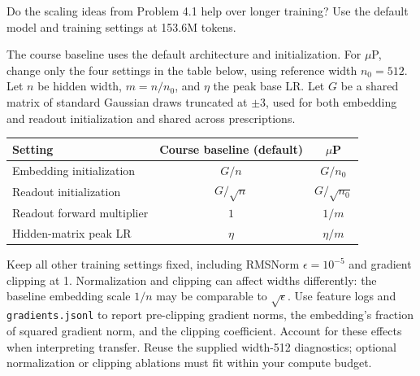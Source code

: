 \clearpage
{}

Do the scaling ideas from Problem 4.1 help over longer training? Use the
default model and training settings at 153.6M tokens.

The course baseline uses the default architecture and initialization.
For $\mu$P, change only the four settings in the table below, using reference
width $n_0=512$. Let $n$ be hidden width, $m=n/n_0$, and $\eta$ the peak base LR.
Let $G$ be a shared matrix of standard Gaussian draws truncated at $\pm3$,
used for both embedding and readout initialization and shared across prescriptions.
\begin{center}
\begin{tabular}{lcc}
\toprule
Setting & Course baseline (default) & $\mu$P \\
\midrule
Embedding initialization & $G/n$ & $G/n_0$ \\
Readout initialization & $G/\sqrt n$ & $G/\sqrt{n_0}$ \\
Readout forward multiplier & $1$ & $1/m$ \\
Hidden-matrix peak LR & $\eta$ & $\eta/m$ \\
\bottomrule
\end{tabular}
\end{center}
Keep all other training settings fixed, including RMSNorm $\epsilon=10^{-5}$
and gradient clipping at 1. Normalization and clipping can affect widths
differently: the baseline embedding scale $1/n$ may be comparable to
$\sqrt\epsilon$. Use feature logs and \texttt{gradients.jsonl} to report
pre-clipping gradient norms, the embedding's fraction of squared gradient
norm, and the clipping coefficient. Account for these effects when interpreting
transfer. Reuse the supplied width-512 diagnostics; optional normalization or
clipping ablations must fit within your compute budget.


